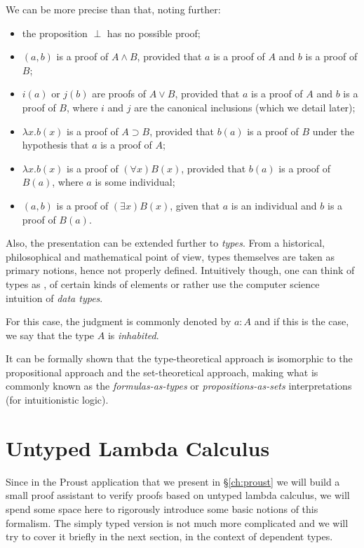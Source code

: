 We can be more precise than that, noting further:
\begin{itemize}
\item the proposition $ \perp $ has no possible proof;
\item $ (a, b) $ is a proof of $ A \land B $, provided that $ a $ is a proof
  of $ A $ and $ b $ is a proof of $ B $;
\item $ i(a) $ or $ j(b) $ are proofs of $ A \lor B $, provided that $ a $
  is a proof of $ A $ and $ b $ is a proof of $ B $, where $ i $ and $ j $
  are the canonical inclusions (which we detail later);
\item $ \lambda x . b(x) $ is a proof of $ A \supset B $, provided that
  $ b(a) $ is a proof of $ B $ under the hypothesis that $ a $ is a proof of $ A $;
\item $ \lambda x . b(x) $ is a proof of $ (\forall x)B(x) $, provided that
  $ b(a) $ is a proof of $ B(a) $, where $ a $ is some individual;
\item $ (a, b) $ is a proof of $ (\exists x)B(x) $, given that $ a $ is an
  individual and $ b $ is a proof of $ B(a) $.
\end{itemize}

Also, the presentation can be extended further to \emph{types}. From a historical,
philosophical and mathematical point of view, types themselves are taken as
primary notions, hence not properly defined. Intuitively though, one can
think of types as ,  of certain kinds of elements
or rather use the computer science intuition of \emph{data types}.

For this case, the judgment  is commonly
denoted by $ a : A $ and if this is the case, we say that the type $ A $ is
\emph{inhabited}.

It can be formally shown that the type-theoretical approach is isomorphic
to the propositional approach and the set-theoretical approach, making what
is commonly known as the \emph{formulas-as-types} or \emph{propositions-as-sets}
interpretations (for intuitionistic logic).

\section{Untyped Lambda Calculus}
\label{sec:unty-lambda}

Since in the Proust application that we present in \S\ref{ch:proust}
we will build a small proof assistant to verify proofs based on
untyped lambda calculus, we will spend some space here to rigorously
introduce some basic notions of this formalism. The simply typed version
is not much more complicated and we will try to cover it briefly in
the next section, in the context of dependent types.

